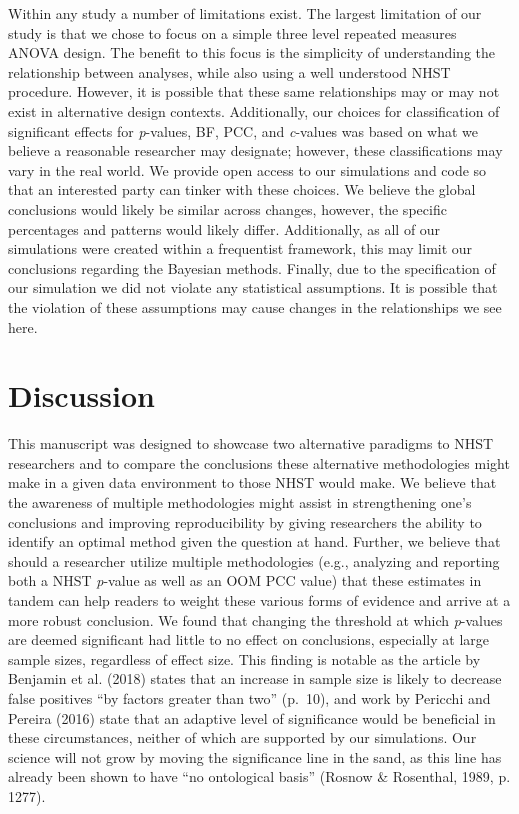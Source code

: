 \documentclass[,man, mask]{apa6}
\theoremstyle{definition}
\theoremstyle{definition}
\theoremstyle{definition}
\theoremstyle{remark}
\begin{document}
Within any study a number of limitations exist. The largest limitation
of our study is that we chose to focus on a simple three level repeated
measures ANOVA design. The benefit to this focus is the simplicity of
understanding the relationship between analyses, while also using a well
understood NHST procedure. However, it is possible that these same
relationships may or may not exist in alternative design contexts.
Additionally, our choices for classification of significant effects for
\emph{p}-values, BF, PCC, and \emph{c}-values was based on what we
believe a reasonable researcher may designate; however, these
classifications may vary in the real world. We provide open access to
our simulations and code so that an interested party can tinker with
these choices. We believe the global conclusions would likely be similar
across changes, however, the specific percentages and patterns would
likely differ. Additionally, as all of our simulations were created
within a frequentist framework, this may limit our conclusions regarding
the Bayesian methods. Finally, due to the specification of our
simulation we did not violate any statistical assumptions. It is
possible that the violation of these assumptions may cause changes in
the relationships we see here.

\section{Discussion}\label{discussion}

This manuscript was designed to showcase two alternative paradigms to
NHST researchers and to compare the conclusions these alternative
methodologies might make in a given data environment to those NHST would
make. We believe that the awareness of multiple methodologies might
assist in strengthening one's conclusions and improving reproducibility
by giving researchers the ability to identify an optimal method given
the question at hand. Further, we believe that should a researcher
utilize multiple methodologies (e.g., analyzing and reporting both a
NHST \emph{p}-value as well as an OOM PCC value) that these estimates in
tandem can help readers to weight these various forms of evidence and
arrive at a more robust conclusion. We found that changing the threshold
at which \emph{p}-values are deemed significant had little to no effect
on conclusions, especially at large sample sizes, regardless of effect
size. This finding is notable as the article by Benjamin et al. (2018)
states that an increase in sample size is likely to decrease false
positives \enquote{by factors greater than two} (p.~10), and work by
Pericchi and Pereira (2016) state that an adaptive level of significance
would be beneficial in these circumstances, neither of which are
supported by our simulations. Our science will not grow by moving the
significance line in the sand, as this line has already been shown to
have \enquote{no ontological basis} (Rosnow \& Rosenthal, 1989, p.
1277).
\end{document}
